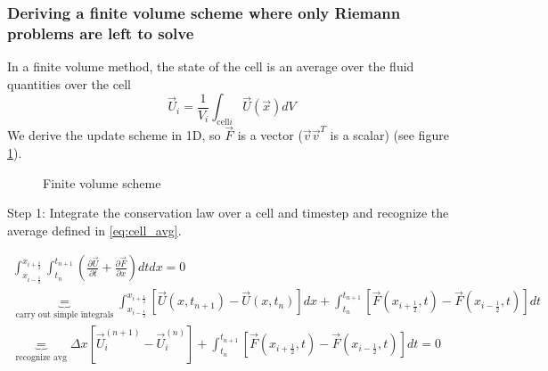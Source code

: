 \subsubsection{Deriving a finite volume scheme where only Riemann problems are left to solve}
In a finite volume method, the state of the cell is an average over the fluid quantities over the cell
\begin{equation}
    \label{eq:cell_avg}
    \vec{U}_i = \frac{1}{V_i} \int_{\text{cell} i}{\vec{U}(\vec{x})} dV
\end{equation}
We derive the update scheme in 1D, so $\vec{F}$ is a vector ($\vec{v}\vec{v}^T$ is a scalar) (see figure \ref{fig:finite_volume_scheme}).

\begin{figure}[htb!]
    \centering
    
    \caption{Finite volume scheme}
    \label{fig:finite_volume_scheme}
\end{figure}

\textcolor{blue1}{Step 1}: Integrate the conservation law over a cell and timestep and recognize the average
defined in \ref{eq:cell_avg}.

\begin{equation}
    \begin{gathered}
        \int_{x_{i-\frac{1}{2}}}^{x_{i+\frac{1}{2}}} \int_{t_n}^{t_{n+1}}\left(\frac{\partial \vec{U}}{\partial t}+\frac{\partial \vec{F}}{\partial x}\right) d t d x=0 \\
        \underbrace{=}_{\text{carry out simple integrals}} \int_{x_{i-\frac{1}{2}}}^{x_{i+\frac{1}{2}}}\left[\vec{U}\left(x, t_{n+1}\right)-\vec{U}\left(x, t_n\right)\right] d x+\int_{t_n}^{t_{n+1}}\left[\vec{F}\left(x_{i+\frac{1}{2}}, t\right)-\vec{F}\left(x_{i-\frac{1}{2}}, t\right)\right] dt \\
        \underbrace{=}_{\text{recognize avg}} \Delta x\left[\vec{U}_i^{(n+1)}-\vec{U}_i^{(n)}\right]+\int_{t_n}^{t_{n+1}}\left[\vec{F}\left(x_{i+\frac{1}{2}}, t\right)-\vec{F}\left(x_{i-\frac{1}{2}}, t\right)\right] d t=0
    \end{gathered}
    \label{eq:finite_volume_scheme_step1}
\end{equation}

